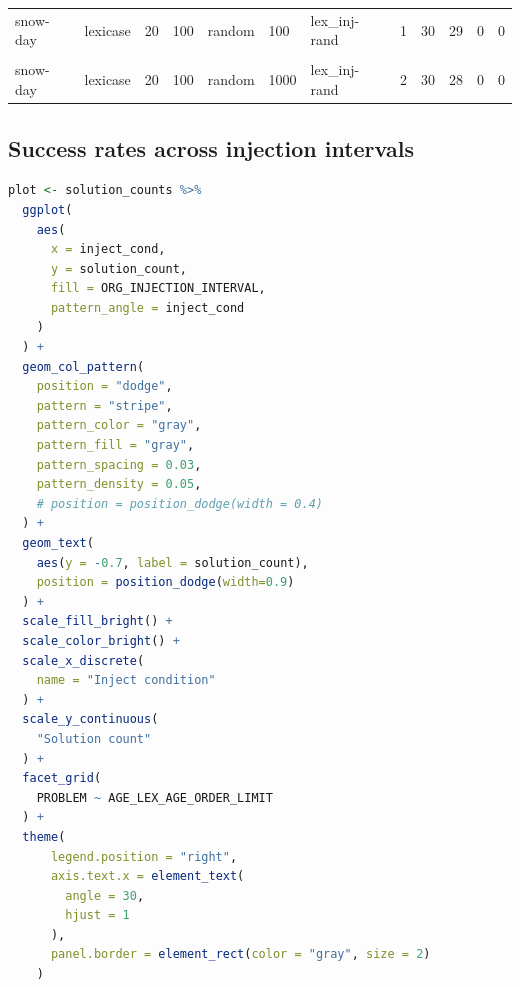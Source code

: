 \documentclass[
]{book}
\begin{document}
\begin{table}
\begin{tabular}{l|l|l|l|l|l|l|r|r|r|r|r}
\hline
\cellcolor{gray!6}{snow-day} & \cellcolor{gray!6}{lexicase} & \cellcolor{gray!6}{20} & \cellcolor{gray!6}{100} & \cellcolor{gray!6}{none} & \cellcolor{gray!6}{1000} & \cellcolor{gray!6}{lex\_inj-none} & \cellcolor{gray!6}{0} & \cellcolor{gray!6}{30} & \cellcolor{gray!6}{30} & \cellcolor{gray!6}{0} & \cellcolor{gray!6}{0}\\
\hline
snow-day & lexicase & 20 & 100 & random & 100 & lex\_inj-rand & 1 & 30 & 29 & 0 & 0\\
\hline
\cellcolor{gray!6}{snow-day} & \cellcolor{gray!6}{lexicase} & \cellcolor{gray!6}{20} & \cellcolor{gray!6}{100} & \cellcolor{gray!6}{random} & \cellcolor{gray!6}{500} & \cellcolor{gray!6}{lex\_inj-rand} & \cellcolor{gray!6}{1} & \cellcolor{gray!6}{30} & \cellcolor{gray!6}{29} & \cellcolor{gray!6}{0} & \cellcolor{gray!6}{0}\\
\hline
snow-day & lexicase & 20 & 100 & random & 1000 & lex\_inj-rand & 2 & 30 & 28 & 0 & 0\\
\hline
\end{tabular}
\endgroup{}
\end{table}

\hypertarget{success-rates-across-injection-intervals}{%
\subsection{Success rates across injection intervals}\label{success-rates-across-injection-intervals}}

\begin{lstlisting}[language=R]
plot <- solution_counts %>%
  ggplot(
    aes(
      x = inject_cond,
      y = solution_count,
      fill = ORG_INJECTION_INTERVAL,
      pattern_angle = inject_cond
    )
  ) +
  geom_col_pattern(
    position = "dodge",
    pattern = "stripe",
    pattern_color = "gray",
    pattern_fill = "gray",
    pattern_spacing = 0.03,
    pattern_density = 0.05,
    # position = position_dodge(width = 0.4)
  ) +
  geom_text(
    aes(y = -0.7, label = solution_count),
    position = position_dodge(width=0.9)
  ) +
  scale_fill_bright() +
  scale_color_bright() +
  scale_x_discrete(
    name = "Inject condition"
  ) +
  scale_y_continuous(
    "Solution count"
  ) +
  facet_grid(
    PROBLEM ~ AGE_LEX_AGE_ORDER_LIMIT
  ) +
  theme(
      legend.position = "right",
      axis.text.x = element_text(
        angle = 30,
        hjust = 1
      ),
      panel.border = element_rect(color = "gray", size = 2)
    )
\end{lstlisting}
\end{document}
